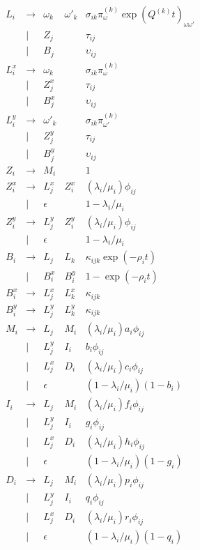 \documentclass{article}
\begin{document}
\[
\begin{array}{rclll}
  L_i & \to & \omega_k & \omega'_k & \sigma_{ik} \pi^{(k)}_{\omega} \exp(Q^{(k)} t)_{\omega \omega'} \\
      & | & Z_j & & \tau_{ij} \\
      & | & B_j & & \upsilon_{ij} \\
  L^x_i & \to & \omega_k & & \sigma_{ik} \pi^{(k)}_{\omega} \\
      & | & Z^x_j & & \tau_{ij} \\
      & | & B^x_j & & \upsilon_{ij} \\
  L^y_i & \to & \omega'_k & & \sigma_{ik} \pi^{(k)}_{\omega'} \\
      & | & Z^y_j & & \tau_{ij} \\
      & | & B^y_j & & \upsilon_{ij} \\
  Z_i & \to & M_i & & 1 \\
  Z^x_i & \to & L^x_j & Z^x_i & (\lambda_i/\mu_i) \phi_{ij} \\
        & | & \epsilon & & 1 - \lambda_i/\mu_i \\
  Z^y_i & \to & L^y_j & Z^y_i & (\lambda_i/\mu_i) \phi_{ij} \\
        & | & \epsilon & & 1 - \lambda_i/\mu_i \\
  B_i & \to & L_j & L_k & \kappa_{ijk} \exp(-\rho_i t) \\
      & | & B^x_i & B^y_i & 1 - \exp(-\rho_i t) \\
  B^x_i & \to & L^x_j & L^x_k & \kappa_{ijk} \\
  B^y_i & \to & L^y_j & L^y_k & \kappa_{ijk} \\
M_i & \to & L_j & M_i & (\lambda_i/\mu_i) a_i \phi_{ij} \\
      & | & L^y_j & I_i & b_i \phi_{ij} \\
      & | & L^x_j & D_i & (\lambda_i/\mu_i) c_i \phi_{ij} \\
      & | & \epsilon & & (1 - \lambda_i/\mu_i) (1-b_i) \\
  I_i & \to & L_j & M_i & (\lambda_i/\mu_i) f_i \phi_{ij} \\
      & | & L^y_j & I_i & g_i \phi_{ij} \\
      & | & L^x_j & D_i & (\lambda_i/\mu_i) h_i \phi_{ij} \\
      & | & \epsilon & & (1 - \lambda_i/\mu_i) (1-g_i) \\
  D_i & \to & L_j & M_i & (\lambda_i/\mu_i) p_i \phi_{ij} \\
      & | & L^y_j & I_i & q_i \phi_{ij} \\
      & | & L^x_j & D_i & (\lambda_i/\mu_i) r_i \phi_{ij} \\
      & | & \epsilon & & (1 - \lambda_i/\mu_i) (1-q_i) \\
\end{array}
\]



\end{document}
